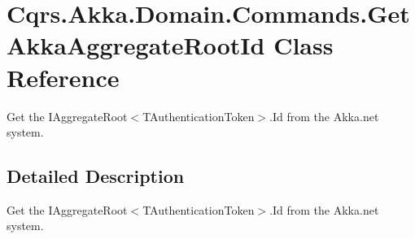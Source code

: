 \hypertarget{classCqrs_1_1Akka_1_1Domain_1_1Commands_1_1GetAkkaAggregateRootId}{}\section{Cqrs.\+Akka.\+Domain.\+Commands.\+Get\+Akka\+Aggregate\+Root\+Id Class Reference}
\label{classCqrs_1_1Akka_1_1Domain_1_1Commands_1_1GetAkkaAggregateRootId}


Get the I\+Aggregate\+Root$<$\+T\+Authentication\+Token$>$.\+Id from the Akka.\+net system.  




\subsection{Detailed Description}
Get the I\+Aggregate\+Root$<$\+T\+Authentication\+Token$>$.\+Id from the Akka.\+net system. 


